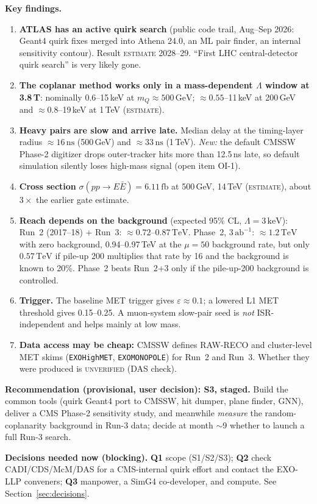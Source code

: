\documentclass[11pt,a4paper]{article}
\newcommand{\EST}{\textsc{estimate}}
\newcommand{\UNV}{\textsc{unverified}}
\newcommand{\mQ}{m_Q}
\newcommand{\GeV}{\,\mathrm{GeV}}
\newcommand{\TeV}{\,\mathrm{TeV}}
\newcommand{\keV}{\,\mathrm{keV}}
\newcommand{\fb}{\,\mathrm{fb}}
\newcommand{\abinv}{\,\mathrm{ab}^{-1}}
\newcommand{\ns}{\,\mathrm{ns}}
\begin{document}
{\textbf{Key findings.}
\begin{enumerate}[leftmargin=1.4em,itemsep=1pt]
\item \textbf{ATLAS has an active quirk search} (public code trail, Aug--Sep 2026: Geant4 quirk fixes merged into Athena 24.0, an ML pair finder, an internal sensitivity contour). Result \EST{} 2028--29. ``First LHC central-detector quirk search'' is very likely gone.
\item \textbf{The coplanar method works only in a mass-dependent $\Lambda$ window at 3.8\,T}: nominally 0.6--15\,keV at $\mQ\approx500\GeV$; $\approx0.55$--11\,keV at 200\,GeV and $\approx0.8$--19\,keV at 1\,TeV (\EST).
\item \textbf{Heavy pairs are slow and arrive late.} Median delay at the timing-layer radius $\approx16\ns$ (500\,GeV) and $\approx33\ns$ (1\,TeV). \emph{New:} the default CMSSW Phase-2 digitizer drops outer-tracker hits more than 12.5\,ns late, so default simulation silently loses high-mass signal (open item OI-1).
\item \textbf{Cross section} $\sigma(pp\to E\bar E)=6.11\fb$ at 500\,GeV, 14\,TeV (\EST), about $3\times$ the earlier gate estimate.
\item \textbf{Reach depends on the background} (expected 95\% CL, $\Lambda=3\keV$): Run~2 (2017--18) + Run~3: $\approx0.72$--$0.87\TeV$. Phase~2, $3\abinv$: $\approx1.2\TeV$ with zero background, 0.94--0.97\,TeV at the $\mu=50$ background rate, but only $0.57\TeV$ if pile-up 200 multiplies that rate by 16 and the background is known to 20\%. Phase~2 beats Run~2+3 only if the pile-up-200 background is controlled.
\item \textbf{Trigger.} The baseline MET trigger gives $\varepsilon\approx0.1$; a lowered L1 MET threshold gives 0.15--0.25. A muon-system slow-pair seed is \emph{not} ISR-independent and helps mainly at low mass.
\item \textbf{Data access may be cheap:} CMSSW defines RAW-RECO and cluster-level MET skims (\texttt{EXOHighMET}, \texttt{EXOMONOPOLE}) for Run~2 and Run~3. Whether they were produced is \UNV{} (DAS check).
\end{enumerate}

\textbf{Recommendation (provisional, user decision): S3, staged.} Build the common tools (quirk Geant4 port to CMSSW, hit dumper, plane finder, GNN), deliver a CMS Phase-2 sensitivity study, and meanwhile \emph{measure} the random-coplanarity background in Run-3 data; decide at month $\sim$9 whether to launch a full Run-3 search.

\textbf{Decisions needed now (blocking).} \textbf{Q1} scope (S1/S2/S3); \textbf{Q2} check CADI/CDS/McM/DAS for a CMS-internal quirk effort and contact the EXO-LLP conveners; \textbf{Q3} manpower, a SimG4 co-developer, and compute. See Section~\ref{sec:decisions}.
}
\end{document}
